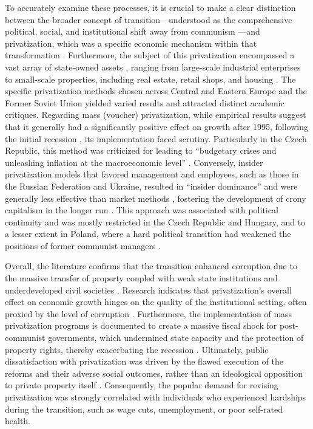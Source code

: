\documentclass[en,magisterska]{pracamgr}
\begin{document}
To accurately examine these processes, it is crucial to make a clear distinction between the broader concept of transition—understood as the comprehensive political, social, and institutional shift away 
from communism \citep{A_Ramet2010}—and privatization, which was a specific economic mechanism within that transformation \citep{Estrin1994, Berg1992}. Furthermore, the subject of this privatization encompassed 
a vast array of state-owned assets \citep{A_Ramet2010}, ranging from large-scale industrial enterprises to small-scale properties, including real estate, retail shops, and housing \citep{EBRD1994, EBRD1999}.
The specific privatization methods chosen across Central and Eastern Europe and the Former Soviet Union yielded varied results and attracted distinct academic critiques. Regarding mass (voucher) 
privatization, while empirical results suggest that it generally had a significantly positive effect on growth after 1995, following the initial recession \citep{Estrin2004}, its implementation 
faced scrutiny. Particularly in the Czech Republic, this method was criticized for leading to ``budgetary crises and unleashing inflation at the macroeconomic level'' \citep{Marcincin1997}. Conversely, 
insider privatization models that favored management and employees, such as those in the Russian Federation and Ukraine, resulted in ``insider dominance'' and were generally less effective
than market methods \citep{Estrin2004, Djankov2002}, fostering the development of crony capitalism in the longer run \citep{Hoff2004, Stiglitz1999}. This approach was associated with political continuity and 
was mostly restricted in the Czech Republic and Hungary, and to a lesser extent in Poland, where a hard political transition had weakened the positions of former communist managers \citep{Soos1997}.

Overall, the literature confirms that the transition enhanced corruption due to the massive transfer of property coupled with weak state institutions 
and underdeveloped civil societies \citep{ Hoff2004, Stiglitz1999, Kaufmann1997}. Research indicates that privatization's overall effect on economic growth hinges on the quality of the 
institutional setting, often proxied by the level of corruption \citep{Cieslik2018}. Furthermore, the implementation of mass privatization programs is documented 
to create a massive fiscal shock for post-communist governments, which undermined state capacity and the protection of property rights, thereby exacerbating the recession 
\citep{Hamm2012}. Ultimately, public dissatisfaction with privatization was driven by the flawed execution of the reforms and their adverse social outcomes, rather than an 
ideological opposition to private property itself \citep{Denisova2012}. Consequently, the popular demand for revising privatization was strongly correlated with individuals 
who experienced hardships during the transition, such as wage cuts, unemployment, or poor self-rated health.
\end{document}
